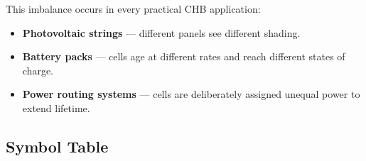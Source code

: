 \documentclass[12pt, a4paper]{article}
\begin{document}
This imbalance occurs in every practical CHB application:
\begin{itemize}
    \item \textbf{Photovoltaic strings} --- different panels see
          different shading.
    \item \textbf{Battery packs} --- cells age at different rates and
          reach different states of charge.
    \item \textbf{Power routing systems} --- cells are deliberately
          assigned unequal power to extend lifetime.
\end{itemize}

\subsection{Symbol Table}
\label{subsec:symbols}
\end{document}
